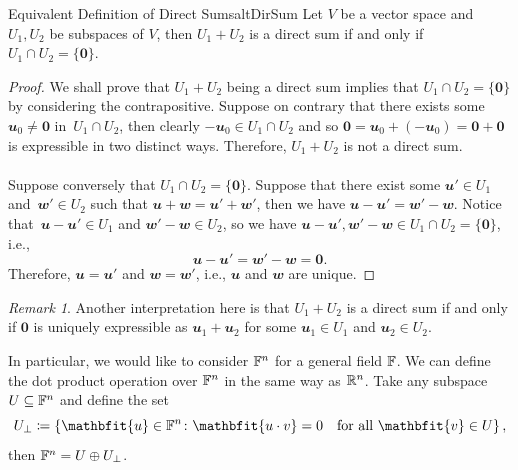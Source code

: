 \documentclass[math]{amznotes}
\theoremstyle{remark}
\newtheorem*{remark}{Remark}
\newcommand{\zero}{\mathbf{0}}
\begin{document}
\begin{thmbox}{Equivalent Definition of Direct Sums}{altDirSum}
    Let $V$ be a vector space and $U_1, U_2$ be subspaces of $V$, then $U_1 + U_2$ is a direct sum if and only if $U_1 \cap U_2 = \{\zero\}$.
    \tcblower
    \begin{proof}
        We shall prove that $U_1 + U_2$ being a direct sum implies that $U_1 \cap U_2 = \{\zero\}$ by considering the contrapositive. Suppose on contrary that there exists some $\mathbfit{u_0 \neq \zero}$ in~$U_1 \cap U_2$, then clearly $-\mathbfit{u}_0 \in U_1 \cap U_2$ and so $\zero = \mathbfit{u}_0 + \left(-\mathbfit{u}_0\right) = \zero + \zero$ is expressible in two distinct ways. Therefore, $U_1 + U_2$ is not a direct sum.
        \\\\
        Suppose conversely that $U_1 \cap U_2 = \{\zero\}$. Suppose that there exist some $\mathbfit{u}' \in U_1$ and~$\mathbfit{w}' \in U_2$ such that $\mathbfit{u + w} = \mathbfit{u}' + \mathbfit{w}'$, then we have $\mathbfit{u - u}' = \mathbfit{w}' - \mathbfit{w}$. Notice that~$\mathbfit{u - u}' \in U_1$ and $\mathbfit{w}' - \mathbfit{w} \in U_2$, so we have $\mathbfit{u - u}', \mathbfit{w}' - \mathbfit{w} \in U_1 \cap U_2 = \{\zero\}$, i.e.,
        \begin{equation*}
            \mathbfit{u - u}' = \mathbfit{w}' - \mathbfit{w} = \zero.
        \end{equation*} 
        Therefore, $\mathbfit{u} = \mathbfit{u}'$ and $\mathbfit{w} = \mathbfit{w}'$, i.e., $\mathbfit{u}$ and $\mathbfit{w}$ are unique.
    \end{proof}
\end{thmbox}
\begin{notebox}
    \begin{remark}
        Another interpretation here is that $U_1 + U_2$ is a direct sum if and only if $\zero$ is uniquely expressible as $\mathbfit{u}_1 + \mathbfit{u}_2$ for some $\mathbfit{u}_1 \in U_1$ and $\mathbfit{u}_2 \in U_2$.
    \end{remark}
\end{notebox}
In particular, we would like to consider $\mathbb{F}^n$ for a general field $\mathbb{F}$. We can define the dot product operation over $\mathbb{F}^n$ in the same way as $\mathbb{R}^n$. Take any subspace $U \subseteq \mathbb{F}^n$ and define the set
\begin{equation*}
    U_{\perp} \coloneqq \left\{\mathbfit{u} \in \F^n \colon \mathbfit{u \cdot v} = 0 \quad\textrm{for all } \mathbfit{v} \in U\right\},
\end{equation*}
then $\mathbb{F}^n = U \oplus U_{\perp}$.
\end{document}

